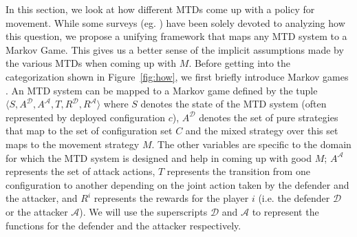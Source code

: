 In this section, we look at how different MTDs come up with a policy for movement. While some surveys (eg. ) have been solely devoted to analyzing how this question, we propose a unifying framework that maps any MTD system to a Markov Game. This gives us a better sense of the implicit assumptions made by the various MTDs when coming up with $M$. Before getting into the categorization shown in Figure~\ref{fig:how}, we first briefly introduce Markov games .
An MTD system can be mapped to a Markov game defined by the tuple $\langle S, A^\mathcal{D}, A^\mathcal{A}, T, R^\mathcal{D}, R^\mathcal{A} \rangle$ where $S$ denotes the state of the MTD system (often represented by deployed configuration $c$), $A^\mathcal{D}$ denotes the set of pure strategies that map to the set of configuration set $C$ and the mixed strategy over this set maps to the movement strategy $M$. The other variables are specific to the domain for which the MTD system is designed and help in coming up with good $M$; $A^\mathcal{A}$ represents the set of attack actions, $T$ represents the transition from one configuration to another depending on the joint action taken by the defender and the attacker, and $R^i$ represents the rewards for the player $i$ (i.e. the defender $\mathcal{D}$ or the attacker $\mathcal{A}$). We will use the superscripts $\mathcal{D}$ and $\mathcal{A}$ to represent the functions for the defender and the attacker respectively.

